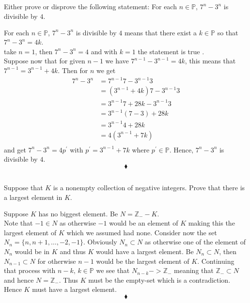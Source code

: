 \subsection{}
\begin{tcolorbox}
Either prove or disprove the following statement: For each $n\in \mathbb{P}$, $7^n-3^n$ is divisible by $4$.
\end{tcolorbox}
$$ $$
 For each $n\in \mathbb{P}$, $7^n-3^n$ is divisible by $4$ means that there exist a $k\in \mathbb{P}$ so that $7^n-3^n=4k$.\\
 take $n=1$, then $7^n-3^n=4$ and with $k=1$ the statement is true .\\
 Suppose now that for  given $n-1$ we have $7^{n-1}-3^{n-1}=4k$,  this means that $7^{n-1}=3^{n-1}+4k$. Then for $n$ we get
 \begin{align*}
7^{n}-3^{n} &=  7^{n-1}7-3^{n-1}3\\
&=\left(3^{n-1}+4k\right)7-3^{n-1}3\\
&=3^{n-1}7+28k-3^{n-1}3\\
&=3^{n-1}(7-3)+28k\\
&=3^{n-1}4+28k\\
&=4\left(3^{n-1}+7k\right)\\
\end{align*}
 and get $7^{n}-3^{n}= 4p^{'}$ with $ p^{'}=3^{n-1}+7k$ where $ p^{'}\in \mathbb{P}$. Hence, $7^{n}-3^{n}$ is divisible by $4$.
$$\blacklozenge$$
\subsection{}
\begin{tcolorbox}
 Suppose that $K$ is a nonempty collection of negative integers. Prove that there is a largest element in $K$. 
\end{tcolorbox}
$$ $$
Suppose $K$ has no biggest element. 
Be $ N= \mathbb{Z}_{-}- K$.\\
Note that $-1\in N$ as otherwise $-1$ would be an element of $K$  making this the largest element of $K$ which we assumed had none. Consider now the set $N_n= \{ n,n+1,\dots, -2,-1 \}$. Obviously $N_n\subset N$ as otherwise one of the element of $N_n$ would be in $K$ and thus $K$ would have a largest element.  
Be $N_n\subset  N$, then $N_{n-1} \subset  N$ for otherwise $n-1$ would be the largest element of $K$. Continuing that process with $n-k, \, k\in \mathbb{P}$ we see that $N_{n-k}-> \mathbb{Z}_{-}$ meaning that $\mathbb{Z}_{-}\subset N$ and hence $N= \mathbb{Z}_{-}$. Thus $K$ must be the empty-set which is a contradiction. Hence $K$ must have a largest element.
$$\blacklozenge$$



